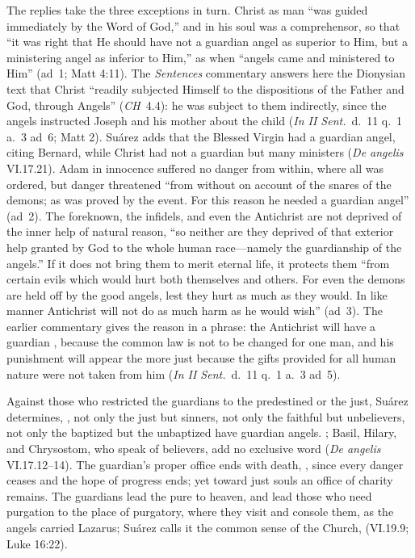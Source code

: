 The replies take the three exceptions in turn. Christ as man ``was guided
immediately by the Word of God,'' and in his soul was a comprehensor, so
that ``it was right that He should have not a guardian angel as superior to
Him, but a ministering angel as inferior to Him,'' as when ``angels came and
ministered to Him'' (ad~1; Matt 4:11). The \emph{Sentences} commentary
answers here the Dionysian text that Christ ``readily subjected Himself to
the dispositions of the Father and God, through Angels'' (\emph{CH}~4.4): he
was subject to them indirectly, since the angels instructed Joseph and his
mother about the child (\emph{In II Sent.}\ d.~11 q.~1 a.~3 ad~6; Matt 2). Suárez adds that the Blessed Virgin had a guardian angel, citing
Bernard, while Christ had not a guardian but many ministers (\emph{De
angelis} VI.17.21). Adam in innocence suffered no danger from within, where
all was ordered, but danger threatened ``from without on account of the
snares of the demons; as was proved by the event. For this reason he needed a
guardian angel'' (ad~2). The foreknown, the infidels, and even the
Antichrist are not deprived of the inner help of natural reason, ``so neither
are they deprived of that exterior help granted by God to the whole human
race---namely the guardianship of the angels.'' If it does not bring them to
merit eternal life, it protects them ``from certain evils which would hurt
both themselves and others. For even the demons are held off by the good
angels, lest they hurt as much as they would. In like manner Antichrist
will not do as much harm as he would wish'' (ad~3). The earlier commentary
gives the reason in a phrase: the Antichrist will have a guardian
, because the common
law is not to be changed for one man, and his punishment will appear the
more just because the gifts provided for all human nature were not taken
from him (\emph{In II Sent.}\ d.~11 q.~1 a.~3 ad~5).

Against those who restricted the guardians to the predestined or the just,
Suárez determines, , not only the just but
sinners, not only the faithful but unbelievers, not only the baptized but the
unbaptized have guardian angels. ; Basil, Hilary, and Chrysostom, who speak of
believers, add no exclusive word (\emph{De angelis} VI.17.12--14). The
guardian's proper office ends with death, , since every danger ceases and
the hope of progress ends; yet toward just souls an office of charity
remains. The guardians lead the pure to heaven, and lead those who need
purgation to the place of purgatory, where they visit and console them, as
the angels carried Lazarus; Suárez calls it the common sense of the Church,
 (VI.19.9; Luke 16:22).


